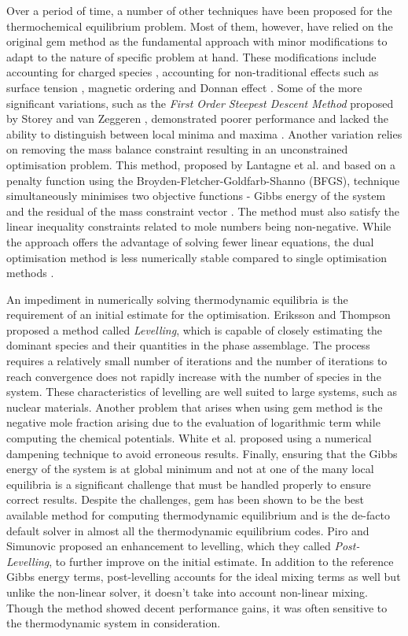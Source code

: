 	Over a period of time, a number of other techniques have been proposed for the thermochemical equilibrium problem. Most of them, however, have relied on the original \gls{gem} method \cite{White:58} as the fundamental approach with minor modifications to adapt to the nature of specific problem at hand. These modifications include accounting for charged species \cite{ERIKSSON1979375}, accounting for non-traditional effects such as surface tension \cite{KOUKKARI200618}, magnetic ordering \cite{Eriksson90} and Donnan effect \cite{PAJARRE200658}. Some of the more significant variations, such as the \emph{First Order Steepest Descent Method} proposed by Storey and van Zeggeren \cite{Storey:1964aa}, demonstrated poorer performance and lacked the ability to distinguish between local minima and maxima \cite{Storey:1964aa,vanZeggeren11}. Another variation relies on removing the mass balance constraint resulting in an unconstrained optimisation problem. This method, proposed by Lantagne et al. and based on a penalty function using the Broyden-Fletcher-Goldfarb-Shanno (BFGS), technique simultaneously minimises two objective functions - Gibbs energy of the system and the residual of the mass constraint vector \cite{LANTAGNE1988589,Nocedal06}. The method must also satisfy the linear inequality constraints related to mole numbers being non-negative. While the approach offers the advantage of solving fewer linear equations, the dual optimisation method is less numerically stable compared to single optimisation methods \cite{Nocedal06}.

	An impediment in numerically solving thermodynamic equilibria is the requirement of an initial estimate for the optimisation. Eriksson and Thompson \cite{Eriksson89} proposed a method called \emph{Levelling}, which is capable of closely estimating the dominant species and their quantities in the phase assemblage. The process requires a relatively small number of iterations and the number of iterations to reach convergence does not rapidly increase with the number of species in the system. These characteristics of levelling are well suited to large systems, such as nuclear materials. Another problem that arises when using \gls{gem} method is the negative mole fraction arising due to the evaluation of logarithmic term while computing the chemical potentials. White et al. proposed using a numerical dampening technique to avoid erroneous results. Finally, ensuring that the Gibbs energy of the system is at global minimum and not at one of the many local equilibria is a significant challenge that must be handled properly to ensure correct results. Despite the challenges, \gls{gem} has been shown to be the best available method for computing thermodynamic equilibrium and is the de-facto default solver in almost all the thermodynamic equilibrium codes. Piro and Simunovic \cite{Piro12a} proposed an enhancement to levelling, which they called \emph{Post-Levelling}, to further improve on the initial estimate. In addition to the reference Gibbs energy terms, post-levelling accounts for the ideal mixing terms as well but unlike the non-linear solver, it doesn't take into account non-linear mixing. Though the method showed decent performance gains, it was often sensitive to the thermodynamic system in consideration.

